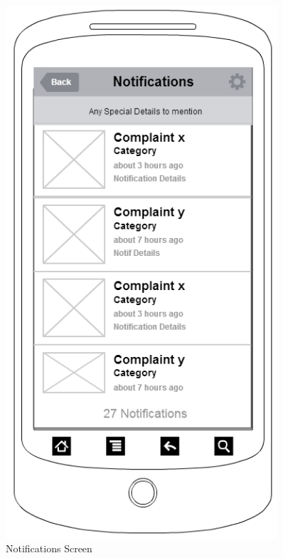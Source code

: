 \documentclass[12pt]{article}
\begin{document}
     \begin{figure}[!ht]
      \begin{minipage}{.5\textwidth}
        \centering
        \includegraphics[width=0.9\textwidth]{./appMockUp/notificationsScreen}
        \caption{Notifications Screen}
        \label{fig:notificationsScreen}
      \end{minipage}
      \begin{minipage}{.5\textwidth}
        \centering

\end{minipage}
\end{figure}
\end{document}
